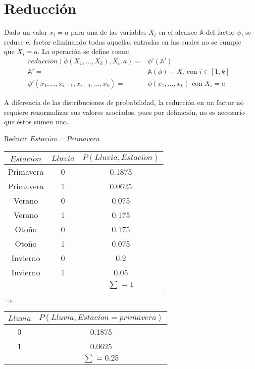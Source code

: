 \section{Reducción}

\begin{definition}[Reducción]
Dado un valor $x_i = a$ para una de las variables $X_i$ en el alcance $\mathbb{A}$ del factor $\phi$, se reduce el factor eliminando todas aquellas entradas en las cuales no se cumple que $X_i = a$.  La operación se define como:
\begin{align}
 reducci\acute{o}n(\phi(X_1,...,X_k), X_i, a) =& \phi'(\mathbb{A'}) \\
 \mathbb{A'} =& \mathbb{A}(\phi) - X_i \text{ con } i \in [1,k] \\
 \phi'(x_1,...,x_{i-1},x_{i+1},...,x_k) =& \phi(x_1,...,x_k) \text{ con } X_i = a
\end{align}
\end{definition}

A diferencia de las distribuciones de probabilidad, la reducción en un factor no requiere renormalizar sus valores asociados, pues por definición, no es necesario que éstos sumen uno.

\begin{example}{Reducir $Estaci\acute{o}n = Primavera$}
\begin{center}
\begin{tabular}{cc|c}
 $Estaci\acute{o}n$ & $Lluvia$ & $P(Lluvia,Estaci\acute{o}n)$ \\ \toprule
 \rowcolor{\colTableRow} Primavera & 0 & 0.1875 \\
 \rowcolor{\colTableRow} Primavera & 1 & 0.0625 \\
 Verano & 0 & 0.075 \\
 Verano & 1 & 0.175 \\
 Otoño & 0 & 0.175 \\
 Otoño & 1 & 0.075 \\
 Invierno & 0 & 0.2 \\
 Invierno & 1 & 0.05 \\
 \multicolumn{2}{c}{}  & $\sum=1$
\end{tabular}$\Rightarrow$
\begin{tabular}{c|c}
 $Lluvia$ & $P(Lluvia,Estaci\acute{o}n = primavera)$ \\ \toprule
 0 & 0.1875 \\
 1 & 0.0625 \\
 \multicolumn{1}{c}{}  & $\sum=0.25$
\end{tabular}
\end{center}
\end{example}


